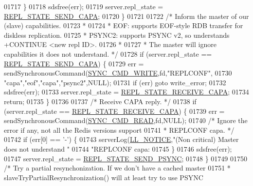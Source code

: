\begin{DoxyCode}
{{{{{{{{{{{{{{{{{{{{{{{{{{{{{{{{{{{{{{{{{{{{{{{{{{{{{{{{{{{{{{{01717         \}
01718         sdsfree(err);
01719         server.repl\_state = \hyperlink{server_8h_a9933a133c5a09bdaa0a35a8152826ea3}{REPL\_STATE\_SEND\_CAPA};
01720     \}
01721 
01722     \textcolor{comment}{/* Inform the master of our (slave) capabilities.}
01723 \textcolor{comment}{     *}
01724 \textcolor{comment}{     * EOF: supports EOF-style RDB transfer for diskless replication.}
01725 \textcolor{comment}{     * PSYNC2: supports PSYNC v2, so understands +CONTINUE <new repl ID>.}
01726 \textcolor{comment}{     *}
01727 \textcolor{comment}{     * The master will ignore capabilities it does not understand. */}
01728     \textcolor{keywordflow}{if} (server.repl\_state == \hyperlink{server_8h_a9933a133c5a09bdaa0a35a8152826ea3}{REPL\_STATE\_SEND\_CAPA}) \{
01729         err = sendSynchronousCommand(\hyperlink{replication_8c_aa4480c458f209657b59d476157d44aab}{SYNC\_CMD\_WRITE},fd,\textcolor{stringliteral}{"REPLCONF"},
01730                 \textcolor{stringliteral}{"capa"},\textcolor{stringliteral}{"eof"},\textcolor{stringliteral}{"capa"},\textcolor{stringliteral}{"psync2"},NULL);
01731         \textcolor{keywordflow}{if} (err) \textcolor{keywordflow}{goto} write\_error;
01732         sdsfree(err);
01733         server.repl\_state = \hyperlink{server_8h_a9dd64738880c47dd6c12b7b90d73ad98}{REPL\_STATE\_RECEIVE\_CAPA};
01734         \textcolor{keywordflow}{return};
01735     \}
01736 
01737     \textcolor{comment}{/* Receive CAPA reply. */}
01738     \textcolor{keywordflow}{if} (server.repl\_state == \hyperlink{server_8h_a9dd64738880c47dd6c12b7b90d73ad98}{REPL\_STATE\_RECEIVE\_CAPA}) \{
01739         err = sendSynchronousCommand(\hyperlink{replication_8c_a5dde0948d622fc1b0327b0d49cb3cef5}{SYNC\_CMD\_READ},fd,NULL);
01740         \textcolor{comment}{/* Ignore the error if any, not all the Redis versions support}
01741 \textcolor{comment}{         * REPLCONF capa. */}
01742         \textcolor{keywordflow}{if} (err[0] == \textcolor{stringliteral}{'-'}) \{
01743             serverLog(\hyperlink{server_8h_a8c54c191e436c7dd3012167212692401}{LL\_NOTICE},\textcolor{stringliteral}{"(Non critical) Master does not understand "}
01744                                   \textcolor{stringliteral}{"REPLCONF capa: %
01745         \}
01746         sdsfree(err);
01747         server.repl\_state = \hyperlink{server_8h_aa9951dea877e8e4f04d910ecf88f92fd}{REPL\_STATE\_SEND\_PSYNC};
01748     \}
01749 
01750     \textcolor{comment}{/* Try a partial resynchonization. If we don't have a cached master}
01751 \textcolor{comment}{     * slaveTryPartialResynchronization() will at least try to use PSYNC}
}}}}}}}}}}}}}}}}}}}}}}}}}}}}}}}}}}}}}}}}}}}}}}}}}}}}}}}}}}}}}}}}
\end{DoxyCode}
